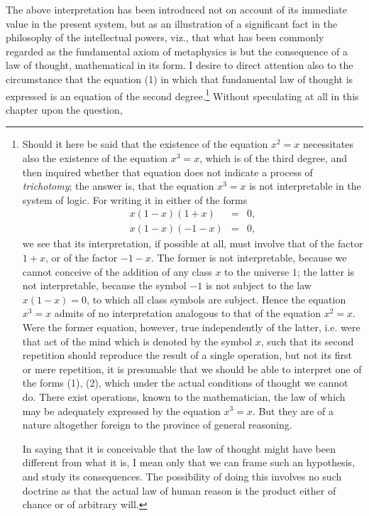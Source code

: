 \documentclass[oneside]{book}
\begin{document}
The above interpretation has been introduced not on account
of its immediate value in the present system, but as an illustration
of a significant fact in the philosophy of the intellectual powers,
viz., that what has been commonly regarded as the fundamental
axiom of metaphysics is but the consequence of a law of thought,
mathematical in its form. I desire to direct attention also to the
circumstance that the equation (1) in which that fundamental
law of thought is expressed is an equation of the second degree.\footnote{%
Should it here be said that the existence of the equation $x^2=x$ necessitates
also the existence of the equation $x^3=x$, which is of the third degree, and then
inquired whether that equation does not indicate a process of \textit{trichotomy}; the
answer is, that the equation $x^3=x$ is not interpretable in the system of logic.
For writing it in either of the forms
\begin{eqnarray}
x\left(1-x\right)\left(1+x\right)&=&0,\\
x\left(1-x\right)\left(-1-x\right)&=&0,
\end{eqnarray}
we see that its interpretation, if possible at all, must involve that of the factor
$1+x$, or of the factor $-1-x$. The former is not interpretable, because we
cannot conceive of the addition of any class $x$ to the universe $1$; the latter is not
interpretable, because the symbol $-1$ is not subject to the law $x(1-x)=0$, to
which all class symbols are subject. Hence the equation $x^3=x$ admits of no interpretation
analogous to that of the equation $x^2=x$. Were the former equation,
however, true independently of the latter, i.e. were that act of the mind which
is denoted by the symbol $x$, such that its second repetition should reproduce the
result of a single operation, but not its first or mere repetition, it is presumable
that we should be able to interpret one of the forms (1), (2), which under the
actual conditions of thought we cannot do. There exist operations, known to
the mathematician, the law of which may be adequately expressed by the equation
$x^3=x$. But they are of a nature altogether foreign to the province of
general reasoning.

In saying that it is conceivable that the law of thought might have been different
from what it is, I mean only that we can frame such an hypothesis, and
study its consequences. The possibility of doing this involves no such doctrine
  as that the actual law of human reason is the product either of chance or of arbitrary
will.}
Without speculating at all in this chapter upon the question,
\end{document}
